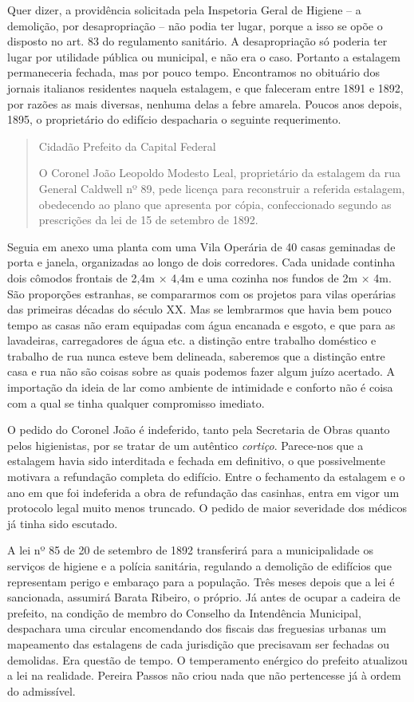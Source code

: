 Quer dizer, a providência solicitada pela Inspetoria Geral de Higiene --
a demolição, por desapropriação -- não podia ter lugar, porque a isso se
opõe o disposto no art. 83 do regulamento sanitário. A desapropriação só
poderia ter lugar por utilidade pública ou municipal, e não era o caso.
Portanto a estalagem permaneceria fechada, mas por pouco tempo.
Encontramos no obituário dos jornais italianos residentes naquela
estalagem, e que faleceram entre 1891 e 1892, por razões as mais
diversas, nenhuma delas a febre amarela. Poucos anos depois, 1895, o
proprietário do edifício despacharia o seguinte requerimento.

\begin{quote}
Cidadão Prefeito da Capital Federal

O Coronel João Leopoldo Modesto Leal, proprietário da estalagem da rua
General Caldwell nº 89, pede licença para reconstruir a referida
estalagem, obedecendo ao plano que apresenta por cópia, confeccionado
segundo as prescrições da lei de 15 de setembro de 1892.
\end{quote}

Seguia em anexo uma planta com uma Vila Operária de 40 casas geminadas
de porta e janela, organizadas ao longo de dois corredores. Cada unidade
continha dois cômodos frontais de 2,4m × 4,4m e uma cozinha nos fundos
de 2m × 4m. São proporções estranhas, se compararmos com os projetos
para vilas operárias das primeiras décadas do século XX. Mas se
lembrarmos que havia bem pouco tempo as casas não eram equipadas com
água encanada e esgoto, e que para as lavadeiras, carregadores de água
etc. a distinção entre trabalho doméstico e trabalho de rua nunca esteve
bem delineada, saberemos que a distinção entre casa e rua não são coisas
sobre as quais podemos fazer algum juízo acertado. A importação da ideia
de lar como ambiente de intimidade e conforto não é coisa com a qual se
tinha qualquer compromisso imediato.

O pedido do Coronel João é indeferido, tanto pela Secretaria de Obras
quanto pelos higienistas, por se tratar de um autêntico \emph{cortiço}.
Parece-nos que a estalagem havia sido interditada e fechada em
definitivo, o que possivelmente motivara a refundação completa do
edifício. Entre o fechamento da estalagem e o ano em que foi indeferida
a obra de refundação das casinhas, entra em vigor um protocolo legal
muito menos truncado. O pedido de maior severidade dos médicos já tinha
sido escutado.

A lei nº 85 de 20 de setembro de 1892 transferirá para a municipalidade
os serviços de higiene e a polícia sanitária, regulando a demolição de
edifícios que representam perigo e embaraço para a população. Três meses
depois que a lei é sancionada, assumirá Barata Ribeiro, o próprio. Já
antes de ocupar a cadeira de prefeito, na condição de membro do Conselho
da Intendência Municipal, despachara uma circular encomendando dos
fiscais das freguesias urbanas um mapeamento das estalagens de cada
jurisdição que precisavam ser fechadas ou demolidas. Era questão de
tempo. O temperamento enérgico do prefeito atualizou a lei na realidade.
Pereira Passos não criou nada que não pertencesse já à ordem do
admissível.

